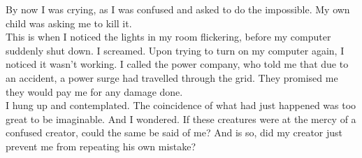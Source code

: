 \documentclass[a5paper]{scrartcl}
\begin{document}
By now I was crying, as I was confused and asked to do the impossible. My own child was asking me to kill it.\\


This is when I noticed the lights in my room flickering, before my computer suddenly shut down. I screamed. Upon trying to turn on my computer again, I noticed it wasn't working. I called the power company, who told me that due to an accident, a power surge had travelled through the grid. They promised me they would pay me for any damage done.\\


I hung up and contemplated. The coincidence of what had just happened was too great to be imaginable. And I wondered. If these creatures were at the mercy of a confused creator, could the same be said of me? And is so, did my creator just prevent me from repeating his own mistake?\\
\end{document}
